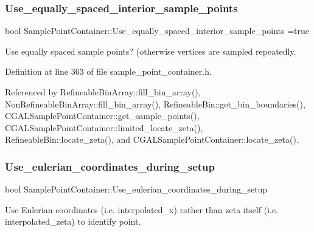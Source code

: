 \subsubsection{\texorpdfstring{Use\+\_\+equally\+\_\+spaced\+\_\+interior\+\_\+sample\+\_\+points}{Use\_equally\_spaced\_interior\_sample\_points}}
{\footnotesize\ttfamily bool Sample\+Point\+Container\+::\+Use\+\_\+equally\+\_\+spaced\+\_\+interior\+\_\+sample\+\_\+points =true\hspace{0.3cm}{\ttfamily [static]}}



Use equally spaced sample points? (otherwise vertices are sampled repeatedly. 



Definition at line 363 of file sample\+\_\+point\+\_\+container.\+h.



Referenced by Refineable\+Bin\+Array\+::fill\+\_\+bin\+\_\+array(), Non\+Refineable\+Bin\+Array\+::fill\+\_\+bin\+\_\+array(), Refineable\+Bin\+::get\+\_\+bin\+\_\+boundaries(), C\+G\+A\+L\+Sample\+Point\+Container\+::get\+\_\+sample\+\_\+points(), C\+G\+A\+L\+Sample\+Point\+Container\+::limited\+\_\+locate\+\_\+zeta(), Refineable\+Bin\+::locate\+\_\+zeta(), and C\+G\+A\+L\+Sample\+Point\+Container\+::locate\+\_\+zeta().

\mbox{\label{classSamplePointContainer_a8d7215f8363d751343efe60a1b051e6a}} 
\subsubsection{\texorpdfstring{Use\+\_\+eulerian\+\_\+coordinates\+\_\+during\+\_\+setup}{Use\_eulerian\_coordinates\_during\_setup}}
{\footnotesize\ttfamily bool Sample\+Point\+Container\+::\+Use\+\_\+eulerian\+\_\+coordinates\+\_\+during\+\_\+setup\hspace{0.3cm}{\ttfamily [protected]}}



Use Eulerian coordinates (i.\+e. interpolated\+\_\+x) rather than zeta itself (i.\+e. interpolated\+\_\+zeta) to identify point. 



